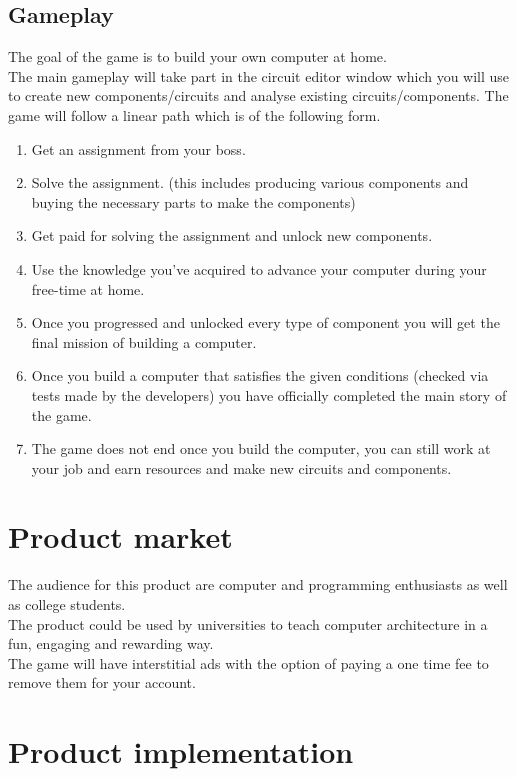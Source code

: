 \documentclass[12pt]{article}
\begin{document}
\subsection{Gameplay}
The goal of the game is to build your own computer at home.\\
The main gameplay will take part in the circuit editor window which you will use to create new components/circuits 
and analyse existing circuits/components.
The game will follow a linear path which is of the following form.\\
\begin{enumerate}
    \item Get an assignment from your boss.
    \item Solve the assignment. (this includes producing various components and buying the necessary parts to make the components)
    \item Get paid for solving the assignment and unlock new components.
    \item Use the knowledge you've acquired to advance your computer during your free-time at home.
    \pagebreak
    \item Once you progressed and unlocked every type of component you will get the final mission of building a computer.
    \item Once you build a computer that satisfies the given conditions (checked via tests made by the developers) you have officially completed the main story of the game.
    \item The game does not end once you build the computer, you can still work at your job and earn resources and make new circuits and components.
\end{enumerate}



\section{Product market}
The audience for this product are computer and programming enthusiasts as well as college students.\\
The product could be used by universities to teach computer architecture in a fun, engaging and rewarding way.\\
The game will have interstitial ads with the option of paying a one time fee to remove them for your account.
\section{Product implementation}
\end{document}
